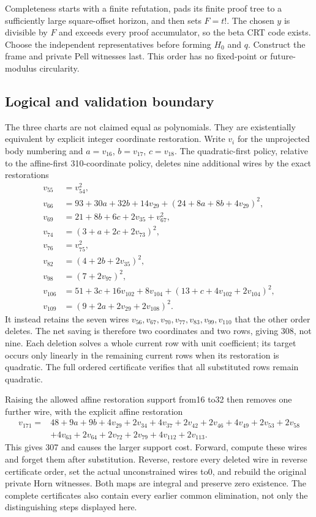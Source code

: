 Completeness starts with a finite refutation, pads its finite proof tree to
a sufficiently large square-offset horizon, and then sets $F=t!$.
The chosen $y$ is divisible by $F$ and exceeds every proof accumulator, so
the beta CRT code exists. Choose the independent representatives before
forming $H_0$ and $q$. Construct the frame and private Pell witnesses last.
This order has no fixed-point or future-modulus circularity.

\subsection{Logical and validation boundary}
The three charts are not claimed equal as polynomials. They are existentially
equivalent by explicit integer coordinate restoration. Write $v_i$ for the
unprojected body numbering and $a=v_{16}$, $b=v_{17}$, $c=v_{18}$.
The quadratic-first policy, relative to the affine-first 310-coordinate
policy, deletes nine additional wires by the exact restorations
\begin{align*}
 v_{55}&=v_{54}^2,\\
 v_{66}&=93+30a+32b+14v_{29}+(24+8a+8b+4v_{29})^2,\\
 v_{69}&=21+8b+6c+2v_{35}+v_{67}^2,\\
 v_{74}&=(3+a+2c+2v_{73})^2,\\
 v_{76}&=v_{75}^2,\\
 v_{82}&=(4+2b+2v_{35})^2,\\
 v_{98}&=(7+2v_{97})^2,\\
 v_{106}&=51+3c+16v_{102}+8v_{104}
             +(13+c+4v_{102}+2v_{104})^2,\\
 v_{109}&=(9+2a+2v_{29}+2v_{108})^2.
\end{align*}
It instead retains the seven wires
$v_{56},v_{67},v_{70},v_{77},v_{83},v_{99},v_{110}$ that the other
order deletes. The net saving is therefore two coordinates and two rows,
giving 308, not nine. Each deletion solves a whole current row with unit
coefficient; its target occurs only linearly in the remaining current rows
when its restoration is quadratic. The full ordered certificate verifies
that all substituted rows remain quadratic.

Raising the allowed affine restoration support from16 to32 then removes
one further wire, with the explicit affine restoration
\begin{align*}
v_{171}={}&48+9a+9b+4v_{29}+2v_{34}+4v_{37}+2v_{42}+2v_{46}
 +4v_{49}+2v_{53}+2v_{58}\\
 &+4v_{63}+2v_{64}+2v_{72}+2v_{79}+4v_{112}+2v_{113}.
\end{align*}
This gives 307 and causes the larger support cost. Forward, compute these
wires and forget them after substitution. Reverse, restore every deleted
wire in reverse certificate order, set the actual unconstrained wires to0,
and rebuild the original private Horn witnesses. Both maps are integral and
preserve zero existence. The complete certificates also contain every earlier
common elimination, not only the distinguishing steps displayed here.

